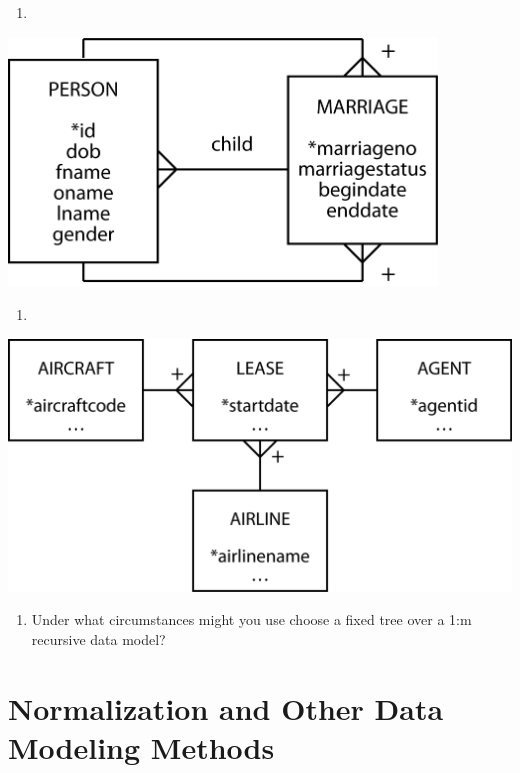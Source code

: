 \documentclass[
]{article}
\providecommand{\tightlist}{%
  \setlength{\itemsep}{0pt}\setlength{\parskip}{0pt}}
\begin{document}
\begin{enumerate}
\def\labelenumi{\arabic{enumi}.}
\setcounter{enumi}{2}
\tightlist
\item
\end{enumerate}

\includegraphics[width=4.47917in,height=\textheight]{Figures/Chapter 7/marriage-5.png}

\begin{enumerate}
\def\labelenumi{\arabic{enumi}.}
\setcounter{enumi}{3}
\tightlist
\item
\end{enumerate}

\includegraphics[width=6.25in,height=\textheight]{Figures/Chapter 7/airline revised.png}

\begin{enumerate}
\def\labelenumi{\arabic{enumi}.}
\setcounter{enumi}{4}
\tightlist
\item
  Under what circumstances might you use choose a fixed tree over a
  1:m recursive data model?
\end{enumerate}

\hypertarget{normalization-and-other-data-modeling-methods}{%
\section{Normalization and Other Data Modeling Methods}\label{normalization-and-other-data-modeling-methods}}
\end{document}
